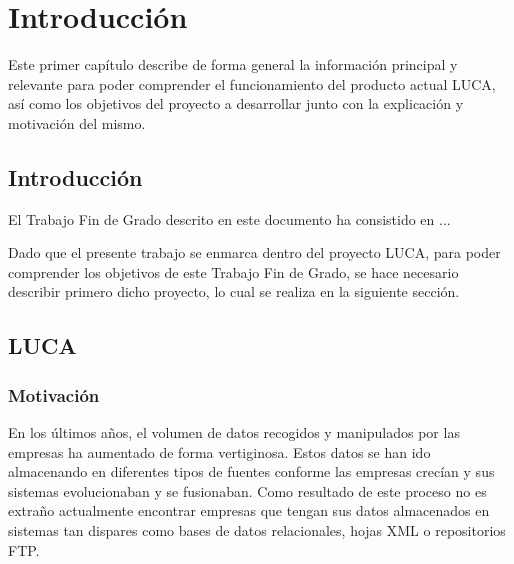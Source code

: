 \chapter{Introducción}

	
Este primer capítulo describe de forma general la información principal y relevante para poder comprender el funcionamiento del producto actual LUCA, así como los objetivos del proyecto a desarrollar junto con la explicación y motivación del mismo.
	
\section{Introducción}

El Trabajo Fin de Grado descrito en este documento ha consistido en ...


Dado que el presente trabajo se enmarca dentro del proyecto LUCA, para poder comprender los objetivos de este Trabajo Fin de Grado, se hace necesario describir primero dicho proyecto, lo cual se realiza en la siguiente sección.

\section{LUCA}

\subsection{Motivación}

En los últimos años, el volumen de datos recogidos y manipulados por las empresas ha aumentado de forma vertiginosa. Estos datos se han ido almacenando en diferentes tipos de fuentes conforme las empresas crecían y sus sistemas evolucionaban y se fusionaban. Como resultado de  este proceso no es extraño actualmente encontrar empresas que tengan sus datos almacenados en sistemas tan dispares como bases de datos relacionales, hojas XML o repositorios FTP.

